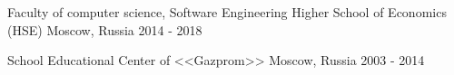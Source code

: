 


\begin{cventries}
\cventry
{Faculty of computer science, Software Engineering} %
{Higher School of Economics (HSE)} %
{Moscow, Russia} %
{2014 - 2018} %
{ %
}


\cventry
{School} %
{Educational Center of <<Gazprom>>} %
{Moscow, Russia} %
{2003 - 2014} %
{ %
}


\end{cventries}